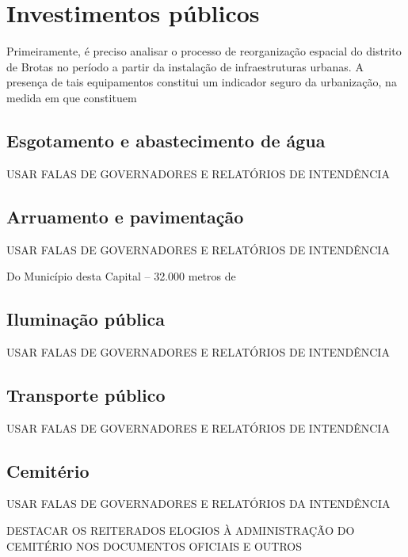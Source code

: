 \section{Investimentos públicos}\label{sec:3.1}

Primeiramente, é preciso analisar o processo de reorganização espacial do distrito de Brotas no período a partir da instalação de infraestruturas urbanas. A presença de tais equipamentos constitui um indicador seguro da urbanização, na medida em que constituem 

\subsection{Esgotamento e abastecimento de água}\label{subsec:3.1.1}

USAR FALAS DE GOVERNADORES E RELATÓRIOS DE INTENDÊNCIA

\subsection{Arruamento e pavimentação}\label{subsec:3.1.2}

USAR FALAS DE GOVERNADORES E RELATÓRIOS DE INTENDÊNCIA

\begin{citacao}
Do Município desta Capital -- 32.000 metros de 
\end{citacao}

\subsection{Iluminação pública}\label{subsec:3.1.3}

USAR FALAS DE GOVERNADORES E RELATÓRIOS DE INTENDÊNCIA

\subsection{Transporte público}\label{subsec:3.1.4}

USAR FALAS DE GOVERNADORES E RELATÓRIOS DE INTENDÊNCIA

\subsection{Cemitério}\label{subsec:3.1.5}

USAR FALAS DE GOVERNADORES E RELATÓRIOS DA INTENDÊNCIA

DESTACAR OS REITERADOS ELOGIOS À ADMINISTRAÇÃO DO CEMITÉRIO NOS DOCUMENTOS OFICIAIS E OUTROS

